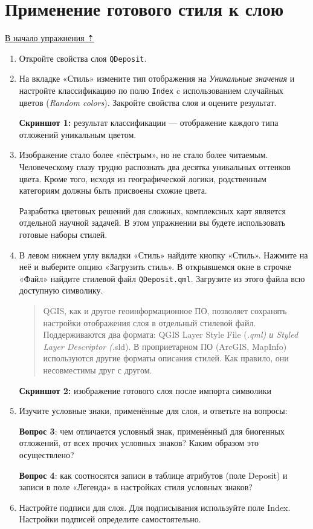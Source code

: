 \documentclass[
  12pt,
]{book}
\begin{document}
\hypertarget{map-design-quaternary-classification}{%
\section{Применение готового стиля к слою}\label{map-design-quaternary-classification}}

\protect\hyperlink{map-design-quaternary}{В начало упражнения ⇡}

\begin{enumerate}
\def\labelenumi{\arabic{enumi}.}
\item
  Откройте свойства слоя \texttt{QDeposit}.
\item
  На вкладке «Стиль» измените тип отображения на \emph{Уникальные значения} и настройте классификацию по полю \texttt{Index} c использованием случайных цветов (\emph{Random colors}). Закройте свойства слоя и оцените результат.

  \textbf{Скриншот 1:} результат классификации --- отображение каждого типа отложений уникальным цветом.
\item
  Изображение стало более «пёстрым», но не стало более читаемым. Человеческому глазу трудно распознать два десятка уникальных оттенков цвета. Кроме того, исходя из географической логики, родственным категориям должны быть присвоены схожие цвета.

  Разработка цветовых решений для сложных, комплексных карт является отдельной научной задачей. В этом упражнении вы будете использовать готовые наборы стилей.
\item
  В левом нижнем углу вкладки «Стиль» найдите кнопку «Стиль». Нажмите на неё и выберите опцию «Загрузить стиль». В открывшемся окне в строчке «Файл» найдите стилевой файл \texttt{QDeposit.qml}. Загрузите из этого файла всю доступную символику.

  \begin{quote}
  QGIS, как и другое геоинформационное ПО, позволяет сохранять настройки отображения слоя в отдельный стилевой файл. Поддерживаются два формата: QGIS Layer Style File (\emph{.qml) и Styled Layer Descriptor (}.sld). В проприетарном ПО (ArcGIS, MapInfo) используются другие форматы описания стилей. Как правило, они несовместимы друг с другом.
  \end{quote}

  \textbf{Скриншот 2:} изображение готового слоя после импорта символики
\item
  Изучите условные знаки, применённые для слоя, и ответьте на вопросы:

  \textbf{Вопрос 3}: чем отличается условный знак, применённый для биогенных отложений, от всех прочих условных знаков? Каким образом это осуществлено?

  \textbf{Вопрос 4}: как соотносятся записи в таблице атрибутов (поле Deposit) и записи в поле «Легенда» в настройках стиля условных знаков?
\item
  Настройте подписи для слоя. Для подписывания используйте поле Index. Настройки подписей определите самостоятельно.
\end{enumerate}
\end{document}
